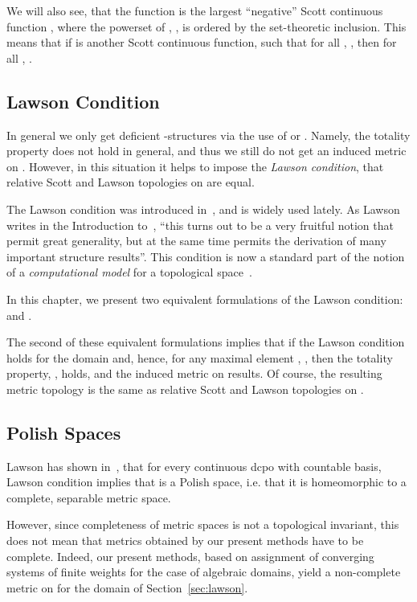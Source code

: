 We will also see, that the function  is the
largest ``negative'' Scott continuous function ,
where the powerset of , , is ordered by the set-theoretic
inclusion.
This means that if  is
another Scott continuous function, 
such that for all , ,
then for all , .

\subsection{Lawson Condition}

In general we only get deficient -structures via the use of
 or .
Namely, the totality property does not hold in general,
and thus we still do not get an induced metric on .
However, in this situation it helps to impose the {\em Lawson
condition}, that relative Scott and Lawson topologies
on  are equal. 

The Lawson condition was introduced in~\cite{Lawson}, and is
widely used lately. As Lawson writes in the
Introduction to~\cite{Lawson}, ``this turns out to be a very fruitful
notion that permit great generality, but at the same time permits
the derivation of many important structure results''. 
This condition is now a standard part of the notion of
a {\em computational model} for a topological space~\cite{Flagg}.

In this chapter, we present two equivalent formulations of the
Lawson condition:  and .

The second of these equivalent formulations implies
that if the Lawson condition holds
for the domain  and, hence, for any 
maximal element , ,
then the totality property,
, holds, and the induced metric on 
results. Of course, the resulting metric topology is the same as
relative Scott and Lawson topologies on .

\subsection{Polish Spaces}

Lawson has shown in~\cite{Lawson}, that for every continuous
dcpo  with countable basis, Lawson condition implies that
 is a Polish space, i.e. that it is homeomorphic to
a complete, separable metric space.

However, since completeness of metric spaces is not a topological
invariant, this does not mean that metrics obtained by our
present methods have to be complete. Indeed, our present methods,
based on assignment of converging systems of finite weights for
the case of algebraic domains, yield a non-complete metric on
 for the domain  of Section~\ref{sec:lawson}.

